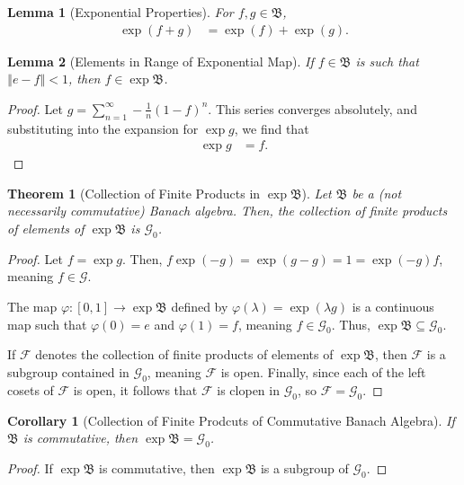 \documentclass[12pt]{extarticle}
\newcommand{\norm}[1]{\left\Vert #1\right\Vert}
\theoremstyle{plain}
\newtheorem*{theorem}{Theorem}
\newtheorem*{lemma}{Lemma}
\newtheorem*{corollary}{Corollary}
\theoremstyle{definition}
\theoremstyle{note}
\renewcommand{\newline}{\hfill\break}
\begin{document}
\begin{lemma}[Exponential Properties]
  For $f,g\in \mathfrak{B}$,
  \begin{align*}
    \exp(f+g) &= \exp(f) + \exp(g).
  \end{align*}
\end{lemma}
\begin{lemma}[Elements in Range of Exponential Map]
  If $f\in \mathfrak{B}$ is such that $\norm{e-f} < 1$, then $f\in \exp \mathfrak{B}$.
\end{lemma}
\begin{proof}
  Let $g = \sum_{n=1}^{\infty}-\frac{1}{n}(1-f)^n$. This series converges absolutely, and substituting into the expansion for $\exp g$, we find that
  \begin{align*}
    \exp g &= f.
  \end{align*}
\end{proof}
\begin{theorem}[Collection of Finite Products in $\exp\mathfrak{B}$]
  Let $\mathfrak{B}$ be a (not necessarily commutative) Banach algebra. Then, the collection of finite products of elements of $\exp \mathfrak{B}$ is $\mathcal{G}_0$.
\end{theorem}
\begin{proof}
  Let $f = \exp g$. Then, $f\exp(-g) = \exp(g-g) = 1 = \exp(-g)f$, meaning $f\in \mathcal{G}$.\newline

  The map $\varphi: [0,1]\rightarrow \exp \mathfrak{B}$ defined by $\varphi(\lambda) = \exp\left(\lambda g\right)$ is a continuous map such that $\varphi(0) = e$ and $\varphi(1) = f$, meaning $f\in \mathcal{G}_0$. Thus, $\exp \mathfrak{B}\subseteq \mathcal{G}_0$.\newline

  If $\mathcal{F}$ denotes the collection of finite products of elements of $\exp \mathfrak{B}$, then $\mathcal{F}$ is a subgroup contained in $\mathcal{G}_0$, meaning $\mathcal{F}$ is open. Finally, since each of the left cosets of $\mathcal{F}$ is open, it follows that $\mathcal{F}$ is clopen in $\mathcal{G}_0$, so $\mathcal{F} = \mathcal{G}_0$.
\end{proof}
\begin{corollary}[Collection of Finite Prodcuts of Commutative Banach Algebra]
  If $\mathfrak{B}$ is commutative, then $\exp \mathfrak{B} = \mathcal{G}_0$.
\end{corollary}
\begin{proof}
  If $\exp \mathfrak{B}$ is commutative, then $\exp \mathfrak{B}$ is a subgroup of $\mathcal{G}_0$.
\end{proof}
\end{document}
